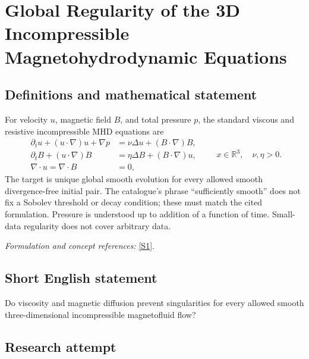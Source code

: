 \documentclass[11pt,a4paper]{article}
\newcommand{\R}{\mathbb{R}}
\newcommand{\sref}[2]{\hyperlink{source:#1:#2}{[S#2]}}
\newif\ifshowcatalogue
\newcommand{\cataloguescope}[1]{\ifshowcatalogue
 \paragraph{Exact scope in the supplied catalogue.}
 \begin{quote}\small #1\end{quote}\fi}
\numberwithin{equation}{section}
\begin{document}
\setcounter{section}{0}
\clearpage
\section*{\texorpdfstring{Global Regularity of the 3D Incompressible Magnetohydrodynamic Equations}{Global Regularity of the 3D Incompressible Magnetohydrodynamic Equations}}\label{statement}
\subsection{Definitions and mathematical statement}
For velocity $u$, magnetic field $B$, and total pressure $p$, the standard viscous and resistive incompressible MHD equations are
\[
 \begin{aligned}
 \partial_tu+(u\cdot\nabla)u+\nabla p&=\nu\Delta u+(B\cdot\nabla)B,\\
 \partial_tB+(u\cdot\nabla)B&=\eta\Delta B+(B\cdot\nabla)u,\\
 \nabla\cdot u=\nabla\cdot B&=0,
 \end{aligned}\qquad x\in\R^3,\quad\nu,\eta>0.
\]
The target is unique global smooth evolution for every allowed smooth divergence-free initial pair. The catalogue's phrase ``sufficiently smooth'' does not fix a Sobolev threshold or decay condition; these must match the cited formulation. Pressure is understood up to addition of a function of time. Small-data regularity does not cover arbitrary data.
\par\smallskip\textit{Formulation and concept references:} \sref{statement}{1}.
\cataloguescope{Prove or disprove that every sufficiently smooth divergence-free initial velocity and magnetic field on R\textasciicircum{}3 generates a unique global smooth solution of the standard incompressible three-dimensional MHD system with positive viscosity and magnetic diffusivity.}
\subsection{Short English statement}
Do viscosity and magnetic diffusion prevent singularities for every allowed smooth three-dimensional incompressible magnetofluid flow?
\subsection{Research attempt}
\end{document}
